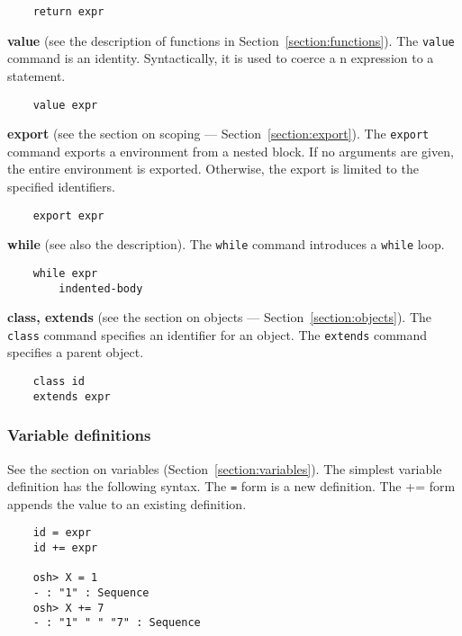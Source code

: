 \begin{verbatim}
    return expr
\end{verbatim}

%
\textbf{value} (see the description of functions in Section~\ref{section:functions}).  The \verb+value+ command is an identity.
Syntactically, it is used to coerce a n expression to a statement.

\begin{verbatim}
    value expr
\end{verbatim}

%
\textbf{export} (see the section on scoping --- Section~\ref{section:export}).  The \verb+export+ command exports
a environment from a nested block.  If no arguments are given, the entire environment is exported.
Otherwise, the export is limited to the specified identifiers.

\begin{verbatim}
    export expr
\end{verbatim}

%
\textbf{while} (see also the  description).  The \verb+while+ command introduces a \verb+while+ loop.

\begin{verbatim}
    while expr
        indented-body
\end{verbatim}

%
\textbf{class, extends} (see the section on objects --- Section~\ref{section:objects}).  The \verb+class+ command
specifies an identifier for an object.  The \verb+extends+ command specifies a parent object.

\begin{verbatim}
    class id
    extends expr
\end{verbatim}

\subsubsection{Variable definitions}

See the section on variables (Section~\ref{section:variables}).  The simplest variable definition has the
following syntax.  The \verb+=+ form is a new definition.  The += form appends the value to
an existing definition.

\begin{verbatim}
    id = expr
    id += expr

    osh> X = 1
    - : "1" : Sequence
    osh> X += 7
    - : "1" " " "7" : Sequence
\end{verbatim}

